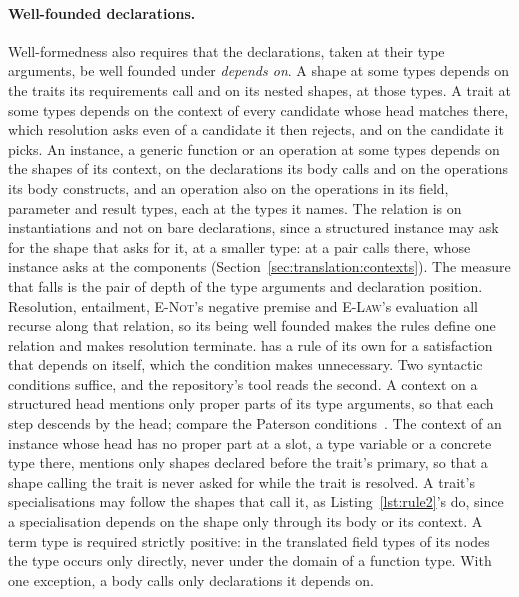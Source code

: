 \paragraph{Well-founded declarations.}
Well-formedness also requires that the declarations, taken at their type arguments, be well founded under \emph{depends on}.
A shape at some types depends on the traits its requirements call and on its nested shapes, at those types.
A trait at some types depends on the context of every candidate whose head matches there, which resolution asks even of a candidate it then rejects, and on the candidate it picks.
An instance, a generic function or an operation at some types depends on the shapes of its context, on the declarations its body calls and on the operations its body constructs, and an operation also on the operations in its field, parameter and result types, each at the types it names.
The relation is on instantiations and not on bare declarations, since a structured instance may ask for the shape that asks for it, at a smaller type:  at a pair calls  there, whose instance asks  at the components (Section~\ref{sec:translation:contexts}).
The measure that falls is the pair of depth of the type arguments and declaration position.
Resolution, entailment, \textsc{E-Not}'s negative premise and \textsc{E-Law}'s evaluation all recurse along that relation, so its being well founded makes the rules define one relation and makes resolution terminate.
\Cpp{} has a rule of its own for a satisfaction that depends on itself, which the condition makes unnecessary.
Two syntactic conditions suffice, and the repository's tool reads the second.
A context on a structured head mentions only proper parts of its type arguments, so that each step descends by the head; compare the Paterson conditions~\cite{sulzmann2007understanding}.
The context of an instance whose head has no proper part at a slot, a type variable or a concrete type there, mentions only shapes declared before the trait's primary, so that a shape calling the trait is never asked for while the trait is resolved.
A trait's specialisations may follow the shapes that call it, as Listing~\ref{lst:rule2}'s do, since a specialisation depends on the shape only through its body or its context.
A term type is required strictly positive: in the translated field types of its nodes the type occurs only directly, never under the domain of a function type.
With one exception, a body calls only declarations it depends on.

